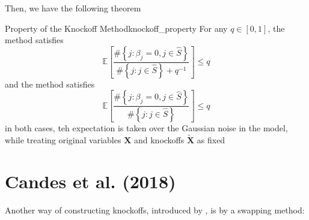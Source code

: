 \documentclass[twoside]{article}
\begin{document}
Then, we have the following theorem
\begin{theorem}{Property of the Knockoff Method}{knockoff_property}
    For any $q\in[0,1]$, the  method satisfies
    $$
    \mathbb{E}\left[ \frac{\# \left\{ j: \beta_j=0, j\in \hat{S}\right\}}{\# \left\{ j: j\in\hat{S} \right\} + q^{-1}} \right]\leq q
    $$
    and the  method satisfies
    $$
    \mathbb{E}\left[ \frac{\# \left\{ j: \beta_j=0, j\in \hat{S}\right\}}{\# \left\{ j: j\in\hat{S} \right\}} \right]\leq q
    $$
    in both cases, teh expectation is taken over the Gaussian noise in the model, while treating original variables $\mathbf{X}$ and knockoffs $\tilde{\mathbf{X}}$ as fixed
\end{theorem}

\section{Candes et al. (2018)}
Another way of constructing knockoffs, introduced by \citet{candes2018panning}, is by a swapping method: 
\end{document}
